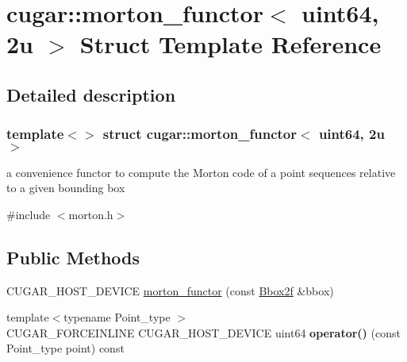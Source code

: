 \hypertarget{structcugar_1_1morton__functor_3_01uint64_00_012u_01_4}{}\section{cugar\+:\+:morton\+\_\+functor$<$ uint64, 2u $>$ Struct Template Reference}
\label{structcugar_1_1morton__functor_3_01uint64_00_012u_01_4}


\subsection{Detailed description}
\subsubsection*{template$<$$>$\newline
struct cugar\+::morton\+\_\+functor$<$ uint64, 2u $>$}

a convenience functor to compute the Morton code of a point sequences relative to a given bounding box 

{\ttfamily \#include $<$morton.\+h$>$}

\subsection*{Public Methods}
\begin{DoxyCompactItemize}
\item 
C\+U\+G\+A\+R\+\_\+\+H\+O\+S\+T\+\_\+\+D\+E\+V\+I\+CE \hyperlink{structcugar_1_1morton__functor_3_01uint64_00_012u_01_4_a3f8e8326fdde7dee3704ea353df1b1f5}{morton\+\_\+functor} (const \hyperlink{structcugar_1_1_bbox}{Bbox2f} \&bbox)
\item 
\mbox{\label{structcugar_1_1morton__functor_3_01uint64_00_012u_01_4_addc5c530f3b0d6a2147bfe379eb109eb}} 
{\footnotesize template$<$typename Point\+\_\+type $>$ }\\C\+U\+G\+A\+R\+\_\+\+F\+O\+R\+C\+E\+I\+N\+L\+I\+NE C\+U\+G\+A\+R\+\_\+\+H\+O\+S\+T\+\_\+\+D\+E\+V\+I\+CE uint64 {\bfseries operator()} (const Point\+\_\+type point) const
\end{DoxyCompactItemize}
